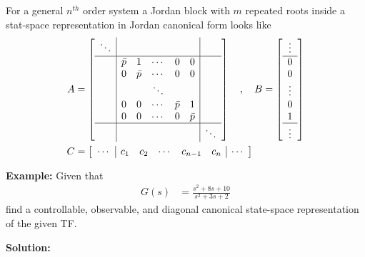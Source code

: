 \documentclass[twoside]{article}
\begin{document}
For a general $n^{th}$ order system a Jordan block 
with $m$ repeated roots inside a stat-space representation
in Jordan canonical form looks like
%
\begin{align*}
A &= \left[ \begin{array}{c|ccccc|c} 
\ddots & & & & & &
\\ \hline
& \bar{p} & 1 & \cdots & 0 & 0 & 
\\ & 0 & \bar{p} & \cdots & 0 & 0
\\ & & & \ddots & & & 
\\ & 0 & 0 & \cdots & \bar{p} & 1
    \\ & 0 & 0 & \cdots & 0 & \bar{p}
\\
\hline
& & & & & & \ddots
 \end{array} \right]
\quad , \quad 
B = \left[ \begin{array}{c} \vdots \\\hline 
0 \\ 0 \\ \vdots \\ 0 \\  1 \\ \hline
\vdots
\end{array} \right]
\\ C &= \left[ \begin{array}{c|ccccc|c} \cdots & 
c_1 & c_2 & \cdots &  c_{n-1} & c_n & \cdots\end{array} \right]
\end{align*}
%



\textbf{Example:} Given that
%
\begin{align*}
G(s) &= \frac{s^2 + 8 s + 10}{s^2 + 3 s + 2}
\end{align*}
%
find a controllable, observable, and  diagonal canonical state-space representation of the given TF.

\vspace{6pt}

\textbf{Solution:}
\end{document}
